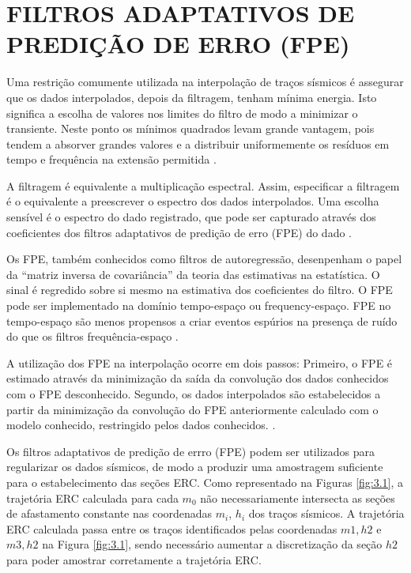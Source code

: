 %
% 
% 
% 
% 
% 
% 

\chapter{FILTROS ADAPTATIVOS DE PREDIÇÃO DE ERRO (FPE)}

Uma restrição comumente utilizada na interpolação de traços sísmicos
é assegurar que os dados interpolados, depois da filtragem,
tenham mínima energia. Isto significa a escolha de valores
nos limites do filtro de modo a minimizar o transiente. Neste ponto os mínimos
quadrados levam grande vantagem, pois tendem a absorver grandes valores e a distribuir
uniformemente os resíduos em tempo e frequência na extensão permitida \cite{claerbout92}.

A filtragem é equivalente a multiplicação espectral. Assim, especificar a filtragem
é o equivalente a preescrever o espectro dos dados interpolados. Uma escolha sensível
é o espectro do dado registrado, que pode ser capturado através dos coeficientes dos
filtros adaptativos de predição de erro (FPE) do dado \cite{spitz}. 

Os FPE, também conhecidos como filtros de autoregressão, desenpenham o
papel da ``matriz inversa de covariância'' da teoria das estimativas na estatística.
O sinal é regredido sobre si mesmo na estimativa dos coeficientes do filtro. O FPE
pode ser implementado na domínio tempo-espaço ou frequency-espaço. FPE no tempo-espaço
são menos propensos a criar eventos espúrios na presença de ruído do que os filtros
frequência-espaço \cite{abma}. 

A utilização dos FPE na interpolação ocorre em dois passos:
Primeiro, o FPE é estimado através da minimização da saída da convolução
dos dados conhecidos com o FPE desconhecido. Segundo, os dados interpolados
são estabelecidos a partir da minimização da convolução do FPE anteriormente 
calculado com o modelo conhecido, restringido pelos dados conhecidos. \cite{curry}.

Os filtros adaptativos de predição de errro (FPE) podem ser utilizados para regularizar os dados sísmicos,
de modo a produzir uma amostragem suficiente para o estabelecimento das seções ERC.
Como representado na Figuras \ref{fig:3.1}, a trajetória ERC calculada para cada $m_0$ não
necessariamente intersecta as seções de afastamento constante nas coordenadas $m_i$, $h_i$ dos traços sísmicos. 
A trajetória ERC calculada passa entre os traços identificados pelas coordenadas $m1,h2$ e $m3, h2$ na Figura \ref{fig:3.1},
sendo necessário aumentar a discretização da seção $h2$ para poder amostrar corretamente a trajetória ERC.

